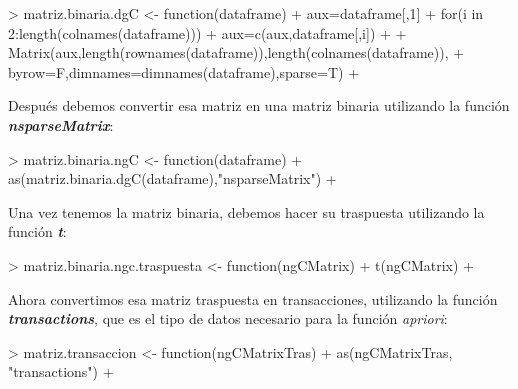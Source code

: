 \documentclass [a4paper] {article}
\begin{document}
\begin{Schunk}
\begin{Sinput}
> matriz.binaria.dgC <- function(dataframe){
+ 	aux=dataframe[,1]
+ 	for(i in 2:length(colnames(dataframe))){
+ 		aux=c(aux,dataframe[,i])
+ 	}
+ 	Matrix(aux,length(rownames(dataframe)),length(colnames(dataframe)),
+ 	       byrow=F,dimnames=dimnames(dataframe),sparse=T)
+ }
\end{Sinput}
\end{Schunk}

Después debemos convertir esa matriz en una matriz binaria utilizando la función \textbf{\textit{nsparseMatrix}}:
\begin{Schunk}
\begin{Sinput}
> matriz.binaria.ngC <- function(dataframe){
+ 	as(matriz.binaria.dgC(dataframe),"nsparseMatrix")
+ }
\end{Sinput}
\end{Schunk}

Una vez tenemos la matriz binaria, debemos hacer su traspuesta utilizando la función \textbf{\textit{t}}:
\begin{Schunk}
\begin{Sinput}
> matriz.binaria.ngc.traspuesta <- function(ngCMatrix){
+ 	t(ngCMatrix)
+ }
\end{Sinput}
\end{Schunk}

Ahora convertimos esa matriz traspuesta en transacciones, utilizando la función \textbf{\textit{transactions}}, que es el tipo de datos
necesario para la función \textit{apriori}:
\begin{Schunk}
\begin{Sinput}
> matriz.transaccion <- function(ngCMatrixTras){
+ 	as(ngCMatrixTras, "transactions")
+ }
\end{Sinput}
\end{Schunk}
\end{document}
